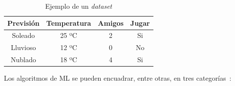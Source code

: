 \documentclass[a4paper, 12pt]{book}
\begin{document}
 \begin{table}[htb]
     \centering
     \begin{tabular}{ c  c  c  c }
          \toprule
          Previsión & Temperatura & Amigos & Jugar\\
          \midrule
           Soleado &  25 ºC & 2 & Si \\
           Lluvioso &  12 ºC & 0 & No\\
           Nublado &  18 ºC & 4 & Si\\
           \bottomrule
     \end{tabular}
     \caption{Ejemplo de un \textit{dataset}}
     \label{tab:my_dataSet}
 \end{table}
 
 Los algoritmos de ML se pueden encuadrar, entre otras, en tres categorías~\cite{James2021}: 
\end{document}
